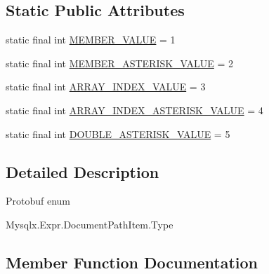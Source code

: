 \subsection*{Static Public Attributes}
\begin{DoxyCompactItemize}
\item 
static final int \mbox{\hyperlink{enumcom_1_1mysql_1_1cj_1_1x_1_1protobuf_1_1_mysqlx_expr_1_1_document_path_item_1_1_type_ae83251ee3879d461332876c26a39cb2d}{M\+E\+M\+B\+E\+R\+\_\+\+V\+A\+L\+UE}} = 1
\item 
static final int \mbox{\hyperlink{enumcom_1_1mysql_1_1cj_1_1x_1_1protobuf_1_1_mysqlx_expr_1_1_document_path_item_1_1_type_a2e157ddfc754d4752aa7712df8252251}{M\+E\+M\+B\+E\+R\+\_\+\+A\+S\+T\+E\+R\+I\+S\+K\+\_\+\+V\+A\+L\+UE}} = 2
\item 
static final int \mbox{\hyperlink{enumcom_1_1mysql_1_1cj_1_1x_1_1protobuf_1_1_mysqlx_expr_1_1_document_path_item_1_1_type_a1402cdbaac31a487aed683701794b283}{A\+R\+R\+A\+Y\+\_\+\+I\+N\+D\+E\+X\+\_\+\+V\+A\+L\+UE}} = 3
\item 
static final int \mbox{\hyperlink{enumcom_1_1mysql_1_1cj_1_1x_1_1protobuf_1_1_mysqlx_expr_1_1_document_path_item_1_1_type_a81f458788366e3549f0efea262976696}{A\+R\+R\+A\+Y\+\_\+\+I\+N\+D\+E\+X\+\_\+\+A\+S\+T\+E\+R\+I\+S\+K\+\_\+\+V\+A\+L\+UE}} = 4
\item 
static final int \mbox{\hyperlink{enumcom_1_1mysql_1_1cj_1_1x_1_1protobuf_1_1_mysqlx_expr_1_1_document_path_item_1_1_type_ac5606ca8a0f37597620e18da44413949}{D\+O\+U\+B\+L\+E\+\_\+\+A\+S\+T\+E\+R\+I\+S\+K\+\_\+\+V\+A\+L\+UE}} = 5
\end{DoxyCompactItemize}


\subsection{Detailed Description}
Protobuf enum
\begin{DoxyCode}
Mysqlx.Expr.DocumentPathItem.Type 
\end{DoxyCode}
 

\subsection{Member Function Documentation}
\mbox{\label{enumcom_1_1mysql_1_1cj_1_1x_1_1protobuf_1_1_mysqlx_expr_1_1_document_path_item_1_1_type_a1f0b41d5ad1ac0b95b2b80d038f43fe6}} 
